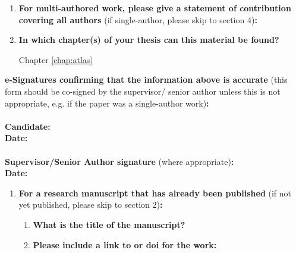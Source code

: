 {\begin{enumerate}[leftmargin=*,label={\bfseries\arabic*.}]
\item \textbf{For multi-authored work, please give a statement of contribution covering all authors} (if single-author, please skip to section 4)\textbf{:}
\item \textbf{In which chapter(s) of your thesis can this material be found?}

Chapter \ref{chap:atlas}
\end{enumerate}

\textbf{e-Signatures confirming that the information above is accurate}
(this form should be co-signed by the supervisor/ senior author unless this is not appropriate, e.g. if the paper was a single-author work)\textbf{:}\\
\textbf{}\\
\textbf{Candidate:}\\
\textbf{Date:}\\
\textbf{}\\
\textbf{Supervisor/Senior Author signature} (where appropriate)\textbf{:}\\
\textbf{Date:}
%

\newpage
\begin{enumerate}[leftmargin=*,label={\bfseries\arabic*.}]\itemsep0em
	\item \textbf{For a research manuscript that has already been published} (if not yet published, please skip to section 2)\textbf{:}
	\begin{enumerate}[label={\alph*)}]\itemsep0em
	\item \textbf{What is the title of the manuscript?}

	\item \textbf{Please include a link to or doi for the work:}


\end{enumerate}
\end{enumerate}}
